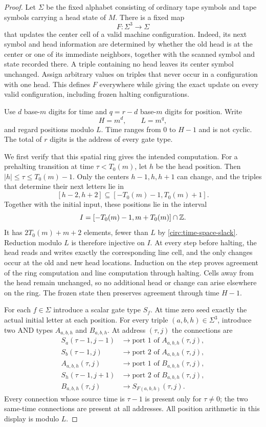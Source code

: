 \begin{proof}
Let $\Sigma$ be the fixed alphabet consisting of ordinary tape symbols and
tape symbols carrying a head state of $M$. There is a fixed map
\[
 F:\Sigma^3\longrightarrow\Sigma
\]
that updates the center cell of a valid machine configuration. Indeed, its
next symbol and head information are determined by whether the old head is
at the center or one of its immediate neighbors, together with the scanned
symbol and state recorded there. A triple containing no head leaves its
center symbol unchanged. Assign arbitrary values on triples that never
occur in a configuration with one head. This defines $F$ everywhere while
giving the exact update on every valid configuration, including frozen
halting configurations.

Use $d$ base-$m$ digits for time and $q=r-d$ base-$m$ digits for position.
Write
\[
 H=m^d,\qquad L=m^q,
\]
and regard positions modulo $L$. Time ranges from $0$ to $H-1$ and is not
cyclic. The total of $r$ digits is the address of every gate type.

We first verify that this spatial ring gives the intended computation.
For a prehalting transition at time $\tau<T_0(m)$, let $h$ be the head
position. Then $|h|\leq\tau\leq T_0(m)-1$. Only the centers
$h-1,h,h+1$ can change, and the triples that determine their next letters
lie in
\[
 [h-2,h+2]\subseteq[-T_0(m)-1,T_0(m)+1].
\]
Together with the initial input, these positions lie in the interval
\[
 I=[-T_0(m)-1,m+T_0(m)]\cap\mathbb{Z}.
\]
It has $2T_0(m)+m+2$ elements, fewer than $L$ by
\eqref{circ:time-space-slack}. Reduction modulo $L$ is therefore injective
on $I$. At every step before halting, the head reads and writes exactly the
corresponding line cell, and the only changes occur at the old and new head
locations. Induction on the step proves agreement of the ring computation
and line computation through halting. Cells away from the head remain
unchanged, so no additional head or change can arise elsewhere on the ring.
The frozen state then preserves agreement through time $H-1$.

For each $f\in\Sigma$ introduce a scalar gate type $S_f$. At time zero seed
exactly the actual initial letter at each position. For every triple
$(a,b,h)\in\Sigma^3$, introduce two AND types $A_{a,b,h}$ and $B_{a,b,h}$.
At address $(\tau,j)$ the connections are
\begin{align*}
 S_a(\tau-1,j-1)&\longrightarrow\text{port 1 of }A_{a,b,h}(\tau,j),\\
 S_b(\tau-1,j)&\longrightarrow\text{port 2 of }A_{a,b,h}(\tau,j),\\
 A_{a,b,h}(\tau,j)&\longrightarrow\text{port 1 of }B_{a,b,h}(\tau,j),\\
 S_h(\tau-1,j+1)&\longrightarrow\text{port 2 of }B_{a,b,h}(\tau,j),\\
 B_{a,b,h}(\tau,j)&\longrightarrow S_{F(a,b,h)}(\tau,j).
\end{align*}
Every connection whose source time is $\tau-1$ is present only for
$\tau\neq0$; the two same-time connections are present at all addresses.
All position arithmetic in this display is modulo $L$.


\end{proof}
